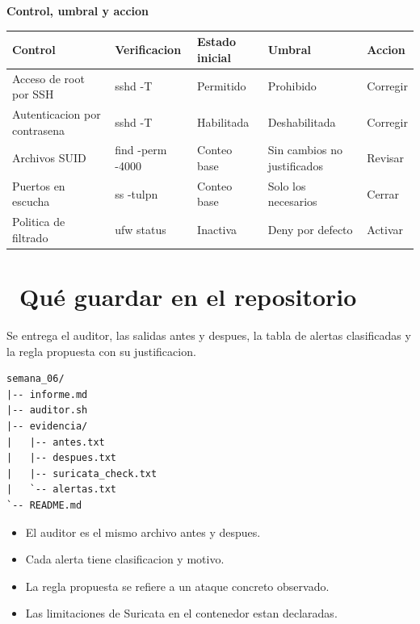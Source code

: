 \documentclass[11pt,a4paper]{article}
\newcommand{\iconotexto}[2]{\textcolor{cyanNeon}{\faIcon{#1}}~#2}
\begin{document}
\begin{center}
\begin{minipage}{\linewidth}
\centering
{\footnotesize
\textbf{Control, umbral y accion}\par\smallskip
\begin{tabular}{@{}>{\raggedright\arraybackslash}p{2.60cm}>{\raggedright\arraybackslash}p{3.20cm}>{\raggedright\arraybackslash}p{2.40cm}>{\raggedright\arraybackslash}p{2.40cm}>{\raggedright\arraybackslash}p{2.60cm}@{}}
\toprule
\textbf{Control} & \textbf{Verificacion} & \textbf{Estado inicial} & \textbf{Umbral} & \textbf{Accion} \\
\midrule
Acceso de root por SSH & sshd -T & Permitido & Prohibido & Corregir \\
Autenticacion por contrasena & sshd -T & Habilitada & Deshabilitada & Corregir \\
Archivos SUID & find -perm -4000 & Conteo base & Sin cambios no justificados & Revisar \\
Puertos en escucha & ss -tulpn & Conteo base & Solo los necesarios & Cerrar \\
Politica de filtrado & ufw status & Inactiva & Deny por defecto & Activar \\
\bottomrule
\end{tabular}
}
\par{}
\end{minipage}
\end{center}

\section{\iconotexto{box-open}{Qué guardar en el repositorio}}

Se entrega el auditor, las salidas antes y despues, la tabla de alertas clasificadas y la regla propuesta con su justificacion.

\begin{lstlisting}[style=estiloCodigo]
semana_06/
|-- informe.md
|-- auditor.sh
|-- evidencia/
|   |-- antes.txt
|   |-- despues.txt
|   |-- suricata_check.txt
|   `-- alertas.txt
`-- README.md
\end{lstlisting}

\begin{itemize}[leftmargin=1.4em,itemsep=2pt,topsep=3pt]
  \item El auditor es el mismo archivo antes y despues.
  \item Cada alerta tiene clasificacion y motivo.
  \item La regla propuesta se refiere a un ataque concreto observado.
  \item Las limitaciones de Suricata en el contenedor estan declaradas.
\end{itemize}
\end{document}
